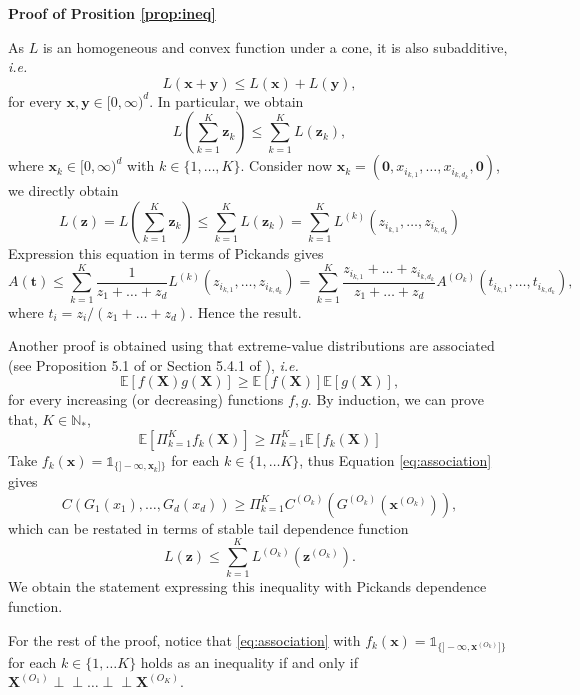 \documentclass[11pt]{article}
\makeatletter
\renewenvironment{proof}[1][\proofname]{\par
\pushQED{\qed}%
\normalfont \topsep6\p@\@plus6\p@\relax
\trivlist
\item\relax
{\textbf{
#1\@addpunct{ }}}\hspace\labelsep\ignorespaces
}{%
\popQED\endtrivlist\@endpefalse
}
\newcommand{\indep}{\perp \!\!\! \perp}
\makeatother
\begin{document}
	\begin{proof}[Proof of Prosition \ref{prop:ineq}]
		As $L$ is an homogeneous and convex function under a cone, it is also subadditive, \emph{i.e.} $$L(\textbf{x} + \textbf{y}) \leq L(\textbf{x}) + L(\textbf{y}),$$ for every $\textbf{x}, \textbf{y} \in [0, \infty)^d$. In particular, we obtain $$L(\sum_{k=1}^K \textbf{z}_k) \leq \sum_{k=1}^K L(\textbf{z}_k),$$ where $\textbf{x}_k \in [0, \infty)^d$ with $k \in \{1,\dots, K\}$. Consider now $\textbf{x}_k = (\textbf{0}, x_{i_{k,1}}, \dots, x_{i_{k,d_k}}, \textbf{0})$, we directly obtain
	\begin{equation*}
		L(\textbf{z}) = L(\sum_{k=1}^K \textbf{z}_k) \leq \sum_{k=1}^K L(\textbf{z}_k) = \sum_{k=1}^K L^{(k)} (z_{i_{k,1}}, \dots, z_{i_{k,d_k}})
	\end{equation*}
	Expression this equation in terms of Pickands gives
	\begin{equation*}
		A(\textbf{t}) \leq \sum_{k=1}^K \frac{1}{z_1 + \dots + z_d} L^{(k)}(z_{i_{k,1}}, \dots, z_{i_{k,d_k}}) = \sum_{k=1}^K \frac{z_{i_{k,1}} + \dots + z_{i_{k,d_k}}}{z_1 + \dots + z_d} A^{(O_k)}(t_{i_{k,1}}, \dots, t_{i_{k,d_k}}),
	\end{equation*}
	where $t_i = z_i / (z_1 + \dots + z_d)$. Hence the result.
	
	Another proof is obtained using that extreme-value distributions are associated (see Proposition 5.1 of \cite{marshall1983} or Section 5.4.1 of \cite{resnick2008extreme}), \emph{i.e.}
	\begin{equation*}
		\mathbb{E}\left[f(\textbf{X}) g(\textbf{X}) \right] \geq \mathbb{E}\left[ f(\textbf{X})\right] \mathbb{E} \left[g(\textbf{X}) \right],
	\end{equation*}
	for every increasing (or decreasing) functions $f,g$. By induction, we can prove that, $K \in \mathbb{N}_*$, 
	\begin{equation}
		\label{eq:association}
		\mathbb{E}\left[\Pi_{k=1}^K f_k(\textbf{X}) \right] \geq \Pi_{k=1}^K \mathbb{E}\left[ f_k(\textbf{X}) \right]
	\end{equation}	
	Take $f_k(\textbf{x}) = \mathds{1}_{\{]-\infty, \textbf{x}_k]\}}$ for each $k \in \{1, \dots K\}$, thus Equation \eqref{eq:association} gives
	\begin{equation*}
		C(G_1(x_1), \dots, G_d(x_d)) \geq \Pi_{k=1}^K C^{(O_k)} \left(G^{(O_k)}\left(\textbf{x}^{(O_k)}\right) \right),
	\end{equation*}
	which can be restated in terms of stable tail dependence function
	\begin{equation*}
		L(\textbf{z}) \leq \sum_{k=1}^K L^{(O_k)}(\textbf{z}^{(O_k)}).
	\end{equation*}
	We obtain the statement expressing this inequality with Pickands dependence function.
	
	For the rest of the proof, notice that \eqref{eq:association} with $f_k(\textbf{x}) = \mathds{1}_{\{]-\infty, \textbf{x}^{(O_k)}]\}}$ for each $k \in \{1, \dots K\}$ holds as an inequality if and only if $\textbf{X}^{(O_1)} \indep \dots \indep \textbf{X}^{(O_K)}$.
	\end{proof}
	
\end{document}
